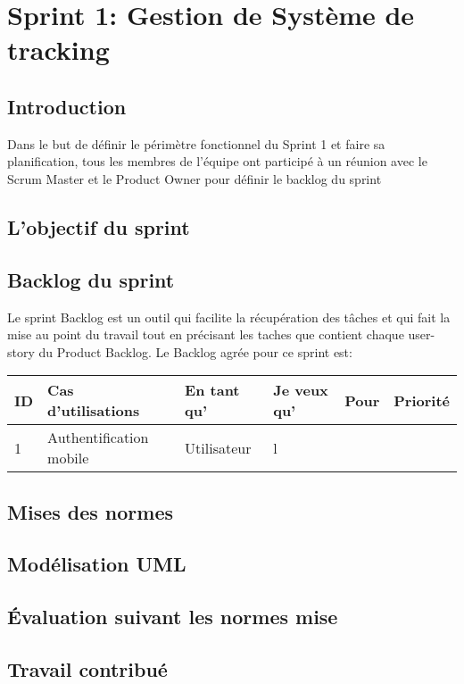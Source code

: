 \section{Sprint 1: Gestion de Système de tracking}

\subsection{Introduction}

Dans le but de définir le périmètre fonctionnel du Sprint 1 et faire
sa planification, tous les membres de l'équipe ont participé à un réunion
avec le Scrum Master et le Product Owner pour définir le backlog du sprint 
\subsection{L'objectif du sprint}
\subsection{Backlog du sprint}
Le sprint Backlog est un outil qui facilite la récupération des tâches et qui fait
la mise au point du travail tout en précisant les taches que contient chaque 
user-story du Product Backlog.
Le Backlog agrée pour ce sprint est:
\begin{center}
 \begin{tabular}{| l | l | l | l | l | l |}
 \hline
 ID & Cas d'utilisations & En tant qu' & Je veux qu' & Pour & Priorité \\ \hline
 1 & Authentification mobile & Utilisateur & l
  
 \end{tabular}

\end{center}
\subsection{Mises des normes}
\subsection{Modélisation UML}
\subsection{Évaluation suivant les normes mise}
\subsection{Travail contribué}



